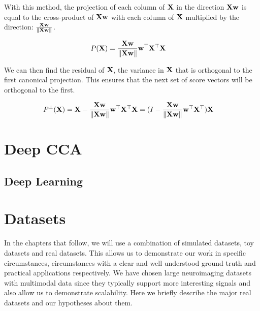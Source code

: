 With this method, the projection of each column of $\bold{X}$ in the direction $\bold{Xw}$ is equal to the cross-product of $\bold{Xw}$ with each column of $\bold{X}$ multiplied by the direction: $\frac{\bold{Xw}}{\|\bold{Xw}\|}$.

\begin{align}
     & P(\bold{X})= \frac{\bold{Xw}}{\|\bold{Xw}\|}\bold{w^{\top}X^{\top}X}
\end{align}

We can then find the residual of $\bold{X}$, the variance in $\bold{X}$  that is orthogonal to the first canonical projection. This ensures that the next set of score vectors will be orthogonal to the first.

\begin{align}
     & P^\perp(\bold{X})= \bold{X} - \frac{\bold{Xw}}{\|\bold{Xw}\|}\bold{w^{\top}X^{\top}X} = (I - \frac{\bold{Xw}}{\|\bold{Xw}\|}\bold{w^{\top}X^{\top})X}
\end{align}

\section{Deep CCA}\label{sec:DCCA}
\subsection{Deep Learning}



\section{Datasets}

In the chapters that follow, we will use a combination of simulated datasets, toy datasets and real datasets. This allows us to demonstrate our work in specific circumstances, circumstances with a clear and well understood ground truth and practical applications respectively. We have chosen large neuroimaging datasets with multimodal data since they typically support more interesting signals and also allow us to demonstrate scalability. Here we briefly describe the major real datasets and our hypotheses about them.





